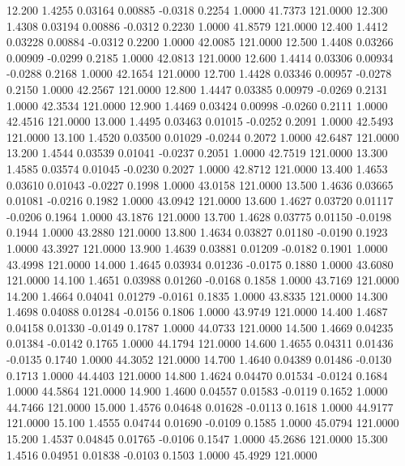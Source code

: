   12.200   1.4255   0.03164   0.00885  -0.0318   0.2254   1.0000  41.7373 121.0000
  12.300   1.4308   0.03194   0.00886  -0.0312   0.2230   1.0000  41.8579 121.0000
  12.400   1.4412   0.03228   0.00884  -0.0312   0.2200   1.0000  42.0085 121.0000
  12.500   1.4408   0.03266   0.00909  -0.0299   0.2185   1.0000  42.0813 121.0000
  12.600   1.4414   0.03306   0.00934  -0.0288   0.2168   1.0000  42.1654 121.0000
  12.700   1.4428   0.03346   0.00957  -0.0278   0.2150   1.0000  42.2567 121.0000
  12.800   1.4447   0.03385   0.00979  -0.0269   0.2131   1.0000  42.3534 121.0000
  12.900   1.4469   0.03424   0.00998  -0.0260   0.2111   1.0000  42.4516 121.0000
  13.000   1.4495   0.03463   0.01015  -0.0252   0.2091   1.0000  42.5493 121.0000
  13.100   1.4520   0.03500   0.01029  -0.0244   0.2072   1.0000  42.6487 121.0000
  13.200   1.4544   0.03539   0.01041  -0.0237   0.2051   1.0000  42.7519 121.0000
  13.300   1.4585   0.03574   0.01045  -0.0230   0.2027   1.0000  42.8712 121.0000
  13.400   1.4653   0.03610   0.01043  -0.0227   0.1998   1.0000  43.0158 121.0000
  13.500   1.4636   0.03665   0.01081  -0.0216   0.1982   1.0000  43.0942 121.0000
  13.600   1.4627   0.03720   0.01117  -0.0206   0.1964   1.0000  43.1876 121.0000
  13.700   1.4628   0.03775   0.01150  -0.0198   0.1944   1.0000  43.2880 121.0000
  13.800   1.4634   0.03827   0.01180  -0.0190   0.1923   1.0000  43.3927 121.0000
  13.900   1.4639   0.03881   0.01209  -0.0182   0.1901   1.0000  43.4998 121.0000
  14.000   1.4645   0.03934   0.01236  -0.0175   0.1880   1.0000  43.6080 121.0000
  14.100   1.4651   0.03988   0.01260  -0.0168   0.1858   1.0000  43.7169 121.0000
  14.200   1.4664   0.04041   0.01279  -0.0161   0.1835   1.0000  43.8335 121.0000
  14.300   1.4698   0.04088   0.01284  -0.0156   0.1806   1.0000  43.9749 121.0000
  14.400   1.4687   0.04158   0.01330  -0.0149   0.1787   1.0000  44.0733 121.0000
  14.500   1.4669   0.04235   0.01384  -0.0142   0.1765   1.0000  44.1794 121.0000
  14.600   1.4655   0.04311   0.01436  -0.0135   0.1740   1.0000  44.3052 121.0000
  14.700   1.4640   0.04389   0.01486  -0.0130   0.1713   1.0000  44.4403 121.0000
  14.800   1.4624   0.04470   0.01534  -0.0124   0.1684   1.0000  44.5864 121.0000
  14.900   1.4600   0.04557   0.01583  -0.0119   0.1652   1.0000  44.7466 121.0000
  15.000   1.4576   0.04648   0.01628  -0.0113   0.1618   1.0000  44.9177 121.0000
  15.100   1.4555   0.04744   0.01690  -0.0109   0.1585   1.0000  45.0794 121.0000
  15.200   1.4537   0.04845   0.01765  -0.0106   0.1547   1.0000  45.2686 121.0000
  15.300   1.4516   0.04951   0.01838  -0.0103   0.1503   1.0000  45.4929 121.0000
